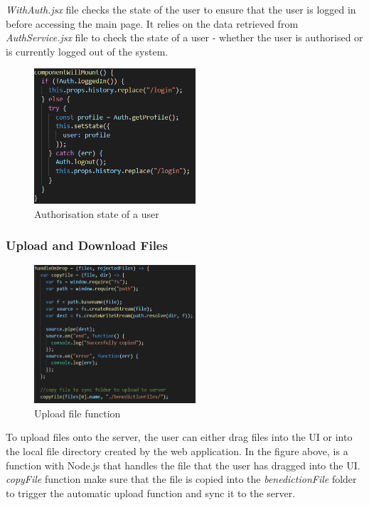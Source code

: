 \documentclass{article}
\begin{document}
\emph{WithAuth.jsx} file checks the state of the user to ensure that the user is logged in before accessing the main page. It relies on the data retrieved from \emph{AuthService.jsx} file to check the state of a user - whether the user is authorised or is currently logged out of the system.

\begin{figure}[H]
\begin{center}
\includegraphics[width=6cm]{withauth.PNG}
\end{center}
\caption{Authorisation state of a user}\label{ex4}
\end{figure}

\subsubsection {Upload and Download Files}

\begin{figure}[H]
\begin{center}
\includegraphics[width=6cm]{uploadDrop.PNG}
\end{center}
\caption{Upload file function}\label{ex4}
\end{figure}

To upload files onto the server, the user can either drag files into the UI or into the local file directory created by the web application. In the figure above, is a function with Node.js that handles the file that the user has dragged into the UI. \emph{copyFile} function make sure that the file is copied into the \emph{benedictionFile} folder to trigger the automatic upload function and sync it to the server.
\end{document}
